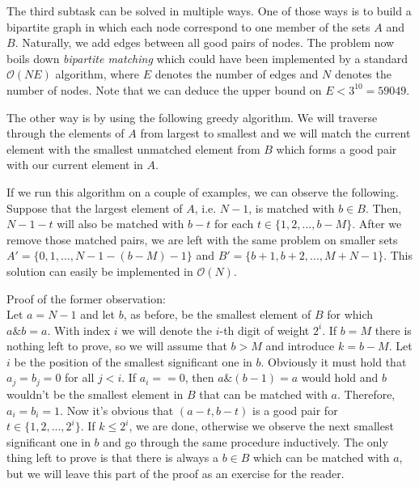 \documentclass[a4paper]{article}
\begin{document}
The third subtask can be solved in multiple ways. One of those ways is to
build a bipartite graph in which each node correspond to one member of the
sets $A$ and $B$. Naturally, we add edges between all good pairs of nodes. The
problem now boils down \emph{bipartite matching} which could have been
implemented by a standard $\mathcal{O}(NE)$ algorithm, where $E$ denotes the
number of edges and $N$ denotes the number of nodes. Note that we can deduce
the upper bound on $E < 3^{10} = 59049$.

The other way is by using the following greedy algorithm. We will traverse
through the elements of $A$ from largest to smallest and we will match the
current element with the smallest unmatched element from $B$ which forms a
good pair with our current element in $A$.

If we run this algorithm on a couple of examples, we can observe the following.
Suppose that the largest element of $A$, i.e. $N - 1$, is matched with $b \in B$.
Then, $N - 1 - t$ will also be matched with $b - t$ for each
$t \in \{1, 2, ..., b - M\}$. After we remove those matched pairs, we are left
with the same problem on smaller sets $A' = \{0, 1, ..., N - 1 - (b - M) - 1\}$
and $B' = \{b + 1, b + 2, ..., M + N - 1\}$. This solution can easily be
implemented in $\mathcal{O}(N)$.

Proof of the former observation:\\
Let $a = N - 1$ and let $b$, as before, be the smallest element of $B$ for which
$a \mathbin\& b = a$. With index $i$ we will denote the $i$-th digit of weight
$2^i$. If $b = M$ there is nothing left to prove, so we will assume that
$b > M$ and introduce $k = b - M$. Let $i$ be the position of the smallest
significant one in $b$. Obviously it must hold that $a_j = b_j = 0$ for all
$j < i$. If $a_i == 0$, then $a \mathbin\& (b - 1) = a$ would hold and $b$
wouldn't be the smallest element in $B$ that can be matched with $a$. Therefore,
$a_i = b_i = 1$. Now it's obvious that $(a - t, b - t)$ is a good pair for
$t \in \{1, 2, ..., 2^i\}$. If $k \leq 2^i$, we are done, otherwise we observe
the next smallest significant one in $b$ and go through the same procedure
inductively. The only thing left to prove is that there is always a $b \in B$
which can be matched with $a$, but we will leave this part of the proof as
an exercise for the reader.
\end{document}
